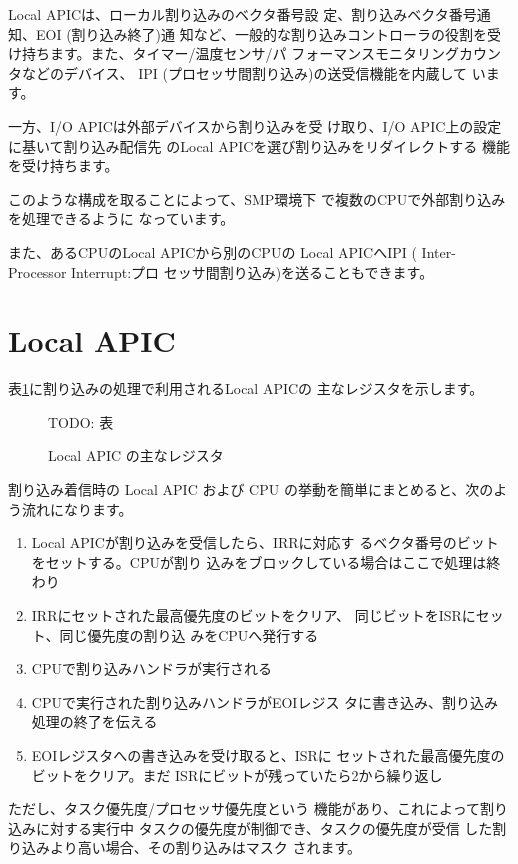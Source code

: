  Local APICは、ローカル割り込みのベクタ番号設
定、割り込みベクタ番号通知、EOI (割り込み終了)通
知など、一般的な割り込みコントローラの役割を受
け持ちます。また、タイマー/温度センサ/パ
フォーマンスモニタリングカウンタなどのデバイス、
IPI (プロセッサ間割り込み)の送受信機能を内蔵して
います。

 一方、I/O APICは外部デバイスから割り込みを受
け取り、I/O APIC上の設定に基いて割り込み配信先
のLocal APICを選び割り込みをリダイレクトする
機能を受け持ちます。

 このような構成を取ることによって、SMP環境下
で複数のCPUで外部割り込みを処理できるように
なっています。

 また、あるCPUのLocal APICから別のCPUの
Local APICへIPI ( Inter-Processor Interrupt:プロ
セッサ間割り込み)を送ることもできます。


\section{Local APIC}

 表\ref{table1}に割り込みの処理で利用されるLocal APICの
主なレジスタを示します。

\begin{figure}\centering
TODO: 表
\caption{Local APIC の主なレジスタ}
\label{table1}
\end{figure}

 割り込み着信時の Local APIC および CPU
の挙動を簡単にまとめると、次のよう流れになります。

\begin{enumerate}
\item Local APICが割り込みを受信したら、IRRに対応す
   るベクタ番号のビットをセットする。CPUが割り
   込みをブロックしている場合はここで処理は終わり
\item IRRにセットされた最高優先度のビットをクリア、
   同じビットをISRにセット、同じ優先度の割り込
   みをCPUへ発行する
\item CPUで割り込みハンドラが実行される
\item CPUで実行された割り込みハンドラがEOIレジス
   タに書き込み、割り込み処理の終了を伝える
\item EOIレジスタへの書き込みを受け取ると、ISRに
   セットされた最高優先度のビットをクリア。まだ
   ISRにビットが残っていたら2から繰り返し
\end{enumerate}

 ただし、タスク優先度/プロセッサ優先度という
機能があり、これによって割り込みに対する実行中
タスクの優先度が制御でき、タスクの優先度が受信
した割り込みより高い場合、その割り込みはマスク
されます。


